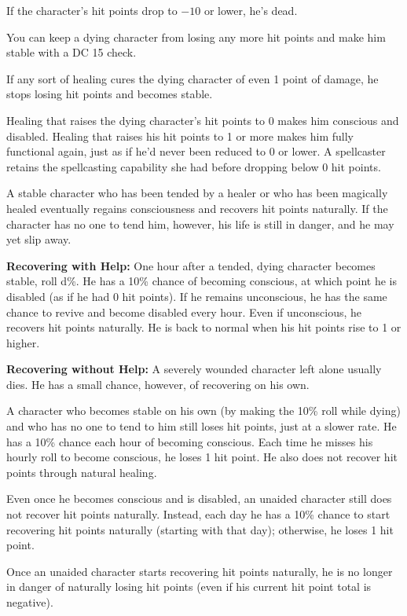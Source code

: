 If the character's hit points drop to $-10$ or lower, he's dead.

You can keep a dying character from losing any more hit points and make him stable with a DC 15  check.

If any sort of healing cures the dying character of even 1 point of damage, he stops losing hit points and becomes stable.

Healing that raises the dying character's hit points to 0 makes him conscious and disabled. Healing that raises his hit points to 1 or more makes him fully functional again, just as if he'd never been reduced to 0 or lower. A spellcaster retains the spellcasting capability she had before dropping below 0 hit points.

A stable character who has been tended by a healer or who has been magically healed eventually regains consciousness and recovers hit points naturally. If the character has no one to tend him, however, his life is still in danger, and he may yet slip away.

\textbf{Recovering with Help:} One hour after a tended, dying character becomes stable, roll d\%. He has a 10\% chance of becoming conscious, at which point he is disabled (as if he had 0 hit points). If he remains unconscious, he has the same chance to revive and become disabled every hour. Even if unconscious, he recovers hit points naturally. He is back to normal when his hit points rise to 1 or higher.

\textbf{Recovering without Help:} A severely wounded character left alone usually dies. He has a small chance, however, of recovering on his own.

A character who becomes stable on his own (by making the 10\% roll while dying) and who has no one to tend to him still loses hit points, just at a slower rate. He has a 10\% chance each hour of becoming conscious. Each time he misses his hourly roll to become conscious, he loses 1 hit point. He also does not recover hit points through natural healing.

Even once he becomes conscious and is disabled, an unaided character still does not recover hit points naturally. Instead, each day he has a 10\% chance to start recovering hit points naturally (starting with that day); otherwise, he loses 1 hit point.

Once an unaided character starts recovering hit points naturally, he is no longer in danger of naturally losing hit points (even if his current hit point total is negative).

